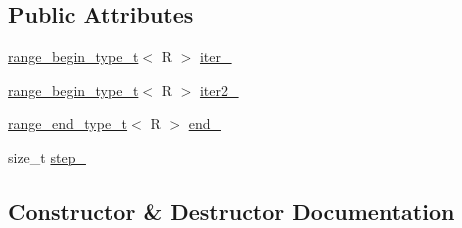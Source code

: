 \subsection*{Public Attributes}
\begin{DoxyCompactItemize}
\item 
\mbox{\hyperlink{namespace_r_a_h___n_a_m_e_s_p_a_c_e_a46705781d6869d5151141f871ced1e9c}{range\+\_\+begin\+\_\+type\+\_\+t}}$<$ R $>$ \mbox{\hyperlink{struct_r_a_h___n_a_m_e_s_p_a_c_e_1_1view_1_1chunk__iterator_a68b188dfca38a6eebd03ce2aee91c33e}{iter\+\_\+}}
\item 
\mbox{\hyperlink{namespace_r_a_h___n_a_m_e_s_p_a_c_e_a46705781d6869d5151141f871ced1e9c}{range\+\_\+begin\+\_\+type\+\_\+t}}$<$ R $>$ \mbox{\hyperlink{struct_r_a_h___n_a_m_e_s_p_a_c_e_1_1view_1_1chunk__iterator_a7fae91da2b31a981b0fd591e138b262e}{iter2\+\_\+}}
\item 
\mbox{\hyperlink{namespace_r_a_h___n_a_m_e_s_p_a_c_e_aadeb8c12d454f4cc70bf80766871d3b2}{range\+\_\+end\+\_\+type\+\_\+t}}$<$ R $>$ \mbox{\hyperlink{struct_r_a_h___n_a_m_e_s_p_a_c_e_1_1view_1_1chunk__iterator_aa0f3f38ab7ce7910a6b6da198cea11ac}{end\+\_\+}}
\item 
size\+\_\+t \mbox{\hyperlink{struct_r_a_h___n_a_m_e_s_p_a_c_e_1_1view_1_1chunk__iterator_ad683d795a58877247cac565ba245598c}{step\+\_\+}}
\end{DoxyCompactItemize}


\subsection{Constructor \& Destructor Documentation}
\mbox{\label{struct_r_a_h___n_a_m_e_s_p_a_c_e_1_1view_1_1chunk__iterator_a4515e1b164e80b4c2a5bef345a95e11e}} 
